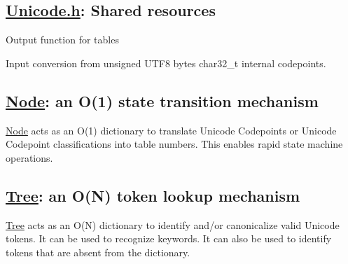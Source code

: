 \subsection*{\hyperlink{_unicode_8h_source}{Unicode.\+h}\+: Shared resources}


\begin{DoxyItemize}
\item Output function for tables
\item Input conversion from unsigned U\+T\+F8 bytes char32\+\_\+t internal codepoints.
\end{DoxyItemize}

\subsection*{\hyperlink{class_node}{Node}\+: an O(1) state transition mechanism}

\hyperlink{class_node}{Node} acts as an O(1) dictionary to translate Unicode Codepoints or Unicode Codepoint classifications into table numbers. This enables rapid state machine operations.

\subsection*{\hyperlink{class_tree}{Tree}\+: an O(\+N) token lookup mechanism}

\hyperlink{class_tree}{Tree} acts as an O(\+N) dictionary to identify and/or canonicalize valid Unicode tokens. It can be used to recognize keywords. It can also be used to identify tokens that are absent from the dictionary. 